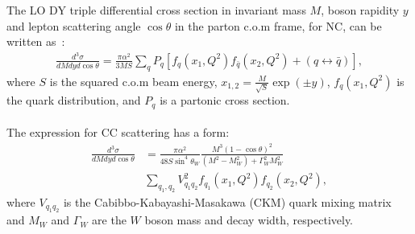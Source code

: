 The LO DY triple differential cross section in invariant mass \(M\), boson rapidity \(y\) 
and lepton scattering angle \(\cos\theta\) in the parton c.o.m frame, 
for NC, can be written as~\cite{Drell:1970wh,Yamada:1981mw}:
\begin{align}
 \textstyle
 \frac{d^3\sigma}{dM{d}y d\cos\theta} =  
 \frac{\pi\alpha^2}{3MS}\sum_{q}P_q \left[f_q(x_1,Q^2)f_{\bar{q}}(x_2,Q^2) 
 + (q\leftrightarrow\bar{q})\right],
\end{align}
where \(S\) is the squared c.o.m beam energy, \(x_{1,2} = \frac{M}{\sqrt{S}}\exp(\pm y)\), $f_q(x_1,Q^2)$ 
is the quark distribution, and 
$P_q$ is a partonic cross section. 
%
\\
\\
The expression for CC  scattering has a form:
\begin{align}
\frac{d^3\sigma}{dMdyd\cos\theta} &=
 \frac{\pi\alpha^2}{48S\sin^4\theta_W}
 \frac{M^3(1-\cos\theta)^2}{(M^2-M_W^2)+\Gamma_W^2M_W^2}  \nonumber \\
 & \sum_{q_1,q_2}V_{q_1q_2}^2f_{q_1}(x_1,Q^2)f_{q_2}(x_2,Q^2),
\end{align}
where \(V_{q_1q_2}\) is the Cabibbo-Kabayashi-Masakawa (CKM) quark mixing matrix and \(M_W\) and \(\Gamma_W\)
are the \(W\) boson mass and decay width, respectively.

